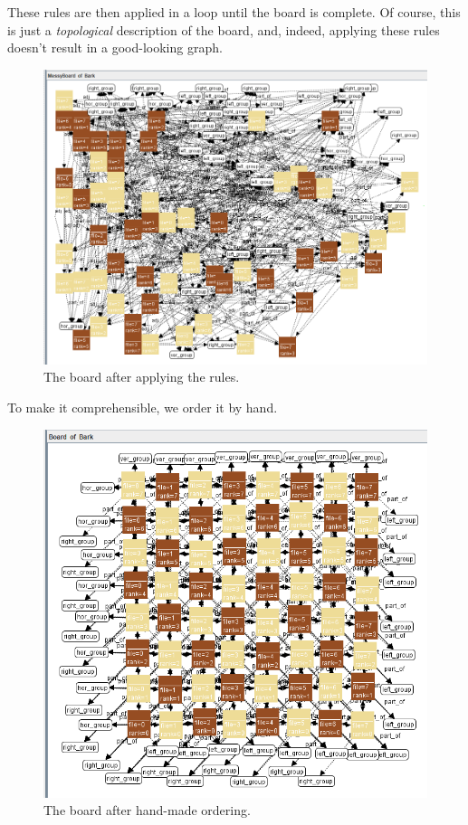 \documentclass[a4paper, 10pt]{scrartcl}
\begin{document}
    These rules are then applied in a loop until the board is complete.
    Of course, this is just a \emph{topological} description of the board, and, indeed, applying these rules doesn't result in a good-looking graph.
    \begin{figure}[H]
        \centering
        \includegraphics[width=.5\linewidth]{images/messy_board.png}
        \caption{The board after applying the rules.}
    \end{figure}
    To make it comprehensible, we order it by hand.
    \begin{figure}[H]
        \centering
        \includegraphics[width=.8\linewidth]{images/board.png}
        \caption{The board after hand-made ordering.}
    \end{figure}
\end{document}
